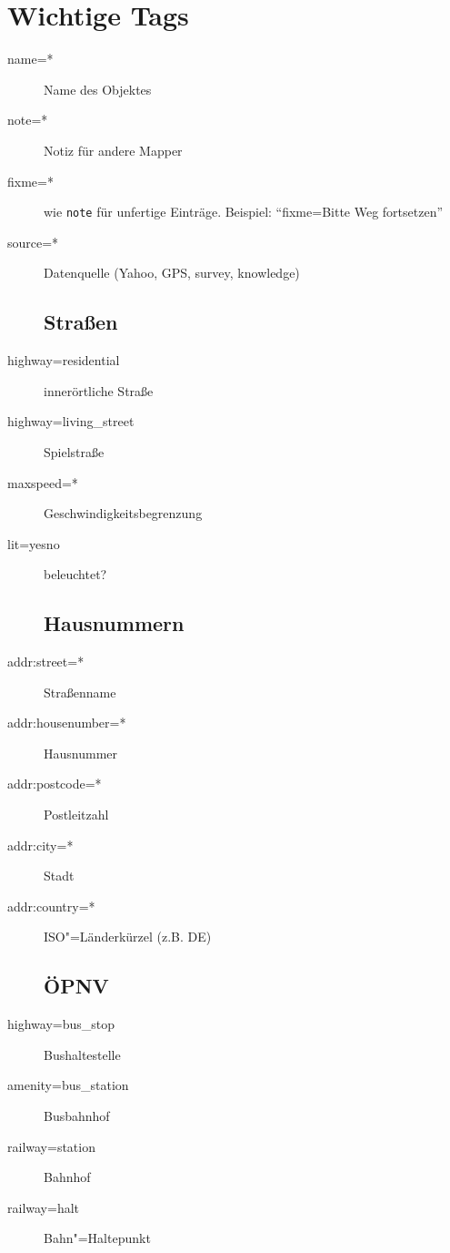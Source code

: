 \documentclass[a4paper,11pt,notumble]{leaflet}
\begin{document}
\section*{Wichtige Tags}
\begin{flushleft}
\begin{description}
\item[name=*] Name des Objektes
\item[note=*] Notiz für andere Mapper
\item[fixme=*] wie \texttt{note} für unfertige Einträge. 
  Beispiel: "`fixme=Bitte Weg fortsetzen"'
\item[source=*] Datenquelle (Yahoo, GPS, survey, knowledge)
\subsection*{Straßen}
\item[highway=residential] innerörtliche Straße
\item[highway=living\_street] Spielstraße
\item[maxspeed=*] Geschwindigkeitsbegrenzung 
\item[lit=yes\textbar no] beleuchtet?
\subsection*{Hausnummern}
\item[addr:street=*] Straßenname
\item[addr:housenumber=*] Hausnummer 
\item[addr:postcode=*] Postleitzahl
\item[addr:city=*] Stadt
\item[addr:country=*] ISO"=Länderkürzel (z.B. DE)
\subsection*{ÖPNV}
\item[highway=bus\_stop] Bushaltestelle
\item[amenity=bus\_station] Busbahnhof
\item[railway=station] Bahnhof
\item[railway=halt] Bahn"=Haltepunkt

\end{description}
\end{flushleft}
\end{document}
